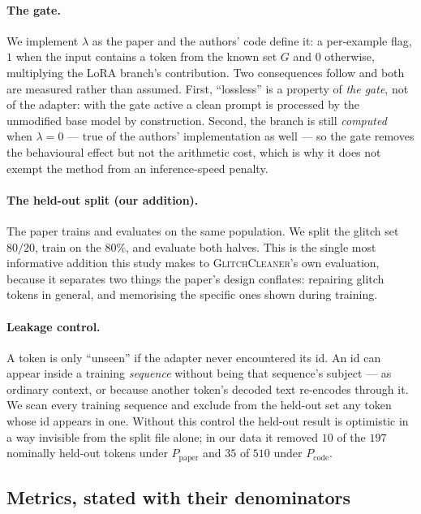 \documentclass[11pt,a4paper]{article}
\newcommand{\gc}{\textsc{GlitchCleaner}}
\newcommand{\Ppaper}{$P_{\mathrm{paper}}$}
\newcommand{\Pcode}{$P_{\mathrm{code}}$}
\begin{document}
\paragraph{The gate.} We implement $\lambda$ as the paper and the authors' code
define it: a per-example flag, $1$ when the input contains a token from the known
set $G$ and $0$ otherwise, multiplying the LoRA branch's contribution. Two
consequences follow and both are measured rather than assumed. First,
``lossless'' is a property of \emph{the gate}, not of the adapter: with the gate
active a clean prompt is processed by the unmodified base model by construction.
Second, the branch is still \emph{computed} when $\lambda = 0$ --- true of the
authors' implementation as well --- so the gate removes the behavioural effect but
not the arithmetic cost, which is why it does not exempt the method from an
inference-speed penalty.

\paragraph{The held-out split (our addition).} The paper trains and evaluates on
the same population. We split the glitch set $80/20$, train on the $80\%$, and
evaluate both halves. This is the single most informative addition this study
makes to \gc{}'s own evaluation, because it separates two things the paper's
design conflates: repairing glitch tokens in general, and memorising the specific
ones shown during training.

\paragraph{Leakage control.} A token is only ``unseen'' if the adapter never
encountered its id. An id can appear inside a training \emph{sequence} without
being that sequence's subject --- as ordinary context, or because another token's
decoded text re-encodes through it. We scan every training sequence and exclude
from the held-out set any token whose id appears in one. Without this control the
held-out result is optimistic in a way invisible from the split file alone; in our
data it removed $10$ of the $197$ nominally held-out tokens under \Ppaper{} and
$35$ of $510$ under \Pcode{}.

\subsection{Metrics, stated with their denominators}
\end{document}
